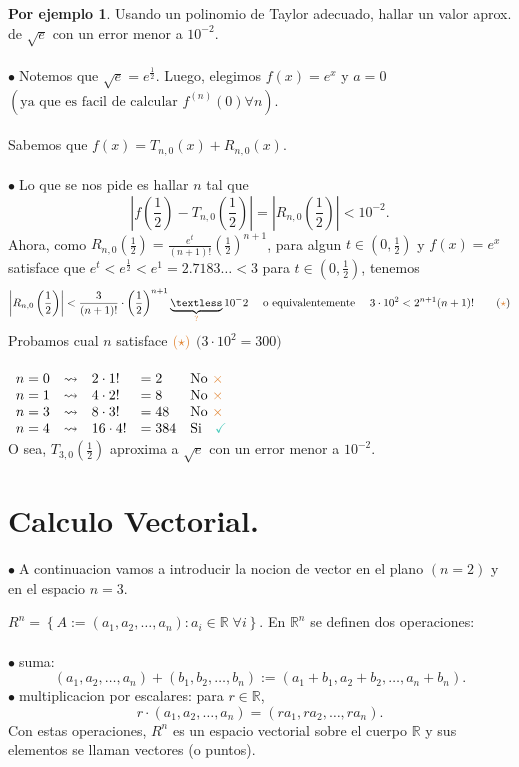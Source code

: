 \documentclass{article}
\theoremstyle{definition}
\theoremstyle{definition}
\newtheorem*{ej}{Por ejemplo}
\theoremstyle{remark}
\newcommand\bl{$\bullet\;$}
\newcommand\ok{\checkmark}
\begin{document}
\begin{ej}
  Usando un polinomio de Taylor adecuado, hallar un valor aprox. de $\sqrt{e}$ con un error menor a $10^{-2}$. \\\\
  \bl Notemos que $\sqrt{e}=e^{\frac{1}{2}}$. Luego, elegimos $f(x)=e^x$ y $a=0$ $\left(\text{ya que es facil de calcular } f^{(n)}(0) \forall n\right)$.
 \\\\
 Sabemos que $f(x)=T_{n,0}(x)+R_{n,0}(x).$ \\\\
 \bl Lo que se nos pide es hallar $n$ tal que \[ 
\left|f\left(\frac{1}{2}\right)-T_{n,0}\left(\frac{1}{2}\right)\right|=\left|R_{n,0}\left(\frac{1}{2}\right)\right| < 10^{-2}.
\]Ahora, como $R_{n,0}\left(\frac{1}{2}\right)=\frac{e^t}{(n+1)!}\left(\frac{1}{2}\right)^{n+1}$, para algun $t \in \left(0,\frac{1}{2}\right)$ y $f(x)=e^x$ satisface que $e^t < e^{\frac{1}{2}} < e^{1}=2.7183\dots < 3$ para $t \in \left(0,\frac{1}{2}\right)$, tenemos \[\left|R_{n,0}\left(\frac{1}{2}\right)\right|<\frac{3}{(n+1)!}\cdot \left(\frac{1}{2}\right)^{n+1} \underbrace{\textless}_{\textcolor{rojop2}{?}} 10^-2 \quad \text{ o equivalentemente } \quad  3 \cdot 10^2 < 2^{n+1}(n+1)! \quad \quad (\textcolor{rojop2}{\star})
\] Probamos cual $n$ satisface $\textcolor{rojop2}{(\star)}$ \quad $\big(3 \cdot 10^2 = 300\big)$ \\\\
$\begin{array}{lllll}
  n=0 & \rightsquigarrow & 2 \cdot 1! & = 2 & \text{No \textcolor{rojop2}{$\times$}} \\
  n=1 & \rightsquigarrow & 4 \cdot 2! & = 8 & \text{No \textcolor{rojop2}{$\times$}} \\
    n=3 & \rightsquigarrow & 8 \cdot 3! & = 48 & \text{No \textcolor{rojop2}{$\times$}} \\
    n=4 & \rightsquigarrow & 16 \cdot 4! & = 384 & \text{Si \; \textcolor{verdep2}{\ok}}
  \end{array}$ \\ O sea, $T_{3,0}\left(\frac{1}{2}\right)$ aproxima a $\sqrt{e}$ con un error menor a $10^{-2}$.
\end{ej}

\section{Calculo Vectorial.}
  
\bl A continuacion vamos a introducir la nocion de vector en el plano $(n=2)$ y en el espacio $n=3$. 
\begin{defi}
  $R^n=\left\{A:=(a_1,a_2, \dots , a_n): a_i \in \mathbb{R} \; \forall i\right\}$. En $\mathbb{R}^n$ se definen dos operaciones: \\\\
  \bl suma: $$(a_1,a_2, \dots ,a_n)+(b_1,b_2, \dots ,b_n):=(a_1+b_1, a_2+b_2, \dots , a_n+b_n).$$ 
  \bl multiplicacion por escalares: para $r \in \mathbb{R}$, $$r \cdot (a_1, a_2, \dots, a_n) = (ra_1, ra_2, \dots, ra_n).$$ 
  Con estas operaciones, $R^n$ es un espacio vectorial sobre el cuerpo $\mathbb{R}$ y sus elementos se llaman vectores (o puntos).
\end{defi}
\end{document}
